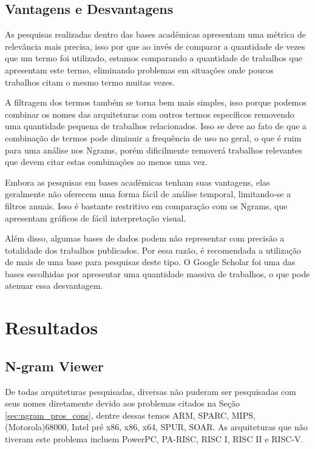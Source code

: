 \documentclass[
	article,			%
	11pt,				%
	oneside,			%
	a4paper,			%
	english,			%
	brazil,				%
	sumario=tradicional
	]{abntex2}
\begin{document}
\subsection{Vantagens e Desvantagens}

As pesquisas realizadas dentro das bases acadêmicas apresentam uma métrica de relevância mais precisa, isso por que ao invés de comparar a quantidade de vezes que um termo foi utilizado, estamos comparando a quantidade de trabalhos que apresentam este termo, eliminando problemas em situações onde poucos trabalhos citam o mesmo termo muitas vezes.

A filtragem dos termos também se torna bem mais simples, isso porque podemos combinar os nomes das arquiteturas com outros termos específicos removendo uma quantidade pequena de trabalhos relacionados. Isso se deve ao fato de que a combinação de termos pode diminuir a frequência de uso no geral, o que é ruim para uma análise nos Ngrams, porém dificilmente removerá trabalhos relevantes que devem citar estas combinações ao menos uma vez.

Embora as pesquisas em bases acadêmicas tenham suas vantagens, elas geralmente não oferecem uma forma fácil de análise temporal, limitando-se a filtros anuais. Isso é bastante restritivo em comparação com os Ngrams, que apresentam gráficos de fácil interpretação visual.

Além disso, algumas bases de dados podem não representar com precisão a totalidade dos trabalhos publicados. Por essa razão, é recomendada a utilização de mais de uma base para pesquisas deste tipo. O Google Scholar foi uma das bases escolhidas por apresentar uma quantidade massiva de trabalhos, o que pode atenuar essa desvantagem.

\section{Resultados}

\subsection{N-gram Viewer}

De todas arquiteturas pesquisadas, diversas não puderam ser pesquisadas com seus nomes diretamente devido aos problemas citados na Seção \ref{sec:ngram_pros_cons}, dentre dessas temos ARM, SPARC, MIPS, (Motorola)68000, Intel pré x86, x86, x64, SPUR, SOAR. As arquiteturas que não tiveram este problema incluem PowerPC, PA-RISC, RISC I, RISC II e RISC-V. 
\end{document}
